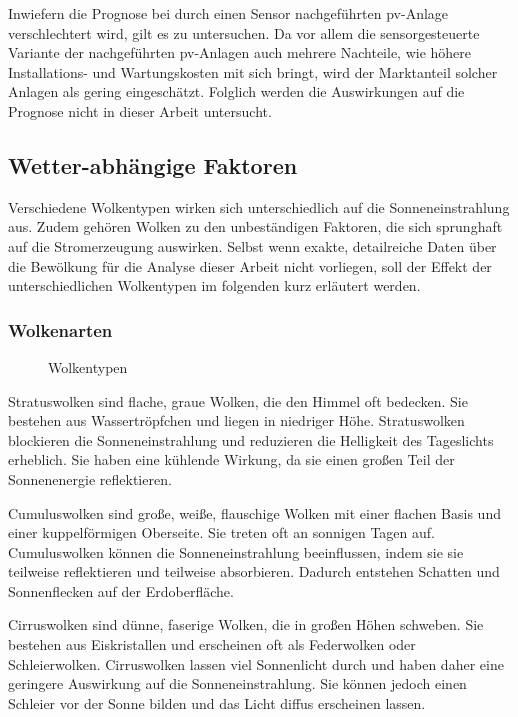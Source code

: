 \documentclass[12pt, a4paper]{article}
\begin{document}
Inwiefern die Prognose bei durch einen Sensor nachgeführten \ac{pv}-Anlage verschlechtert wird, gilt es zu untersuchen. Da vor allem die sensorgesteuerte Variante der nachgeführten \ac{pv}-Anlagen auch mehrere Nachteile, wie höhere Installations- und Wartungskosten mit sich bringt, wird der Marktanteil solcher Anlagen als gering eingeschätzt. Folglich werden die Auswirkungen auf die Prognose nicht in dieser Arbeit untersucht.

\subsection{Wetter-abhängige Faktoren}

Verschiedene Wolkentypen wirken sich unterschiedlich auf die Sonneneinstrahlung aus. Zudem gehören Wolken zu den unbeständigen Faktoren, die sich sprunghaft auf die Stromerzeugung auswirken. Selbst wenn exakte, detailreiche Daten über die Bewölkung für die Analyse dieser Arbeit nicht vorliegen, soll der Effekt der unterschiedlichen Wolkentypen im folgenden kurz erläutert werden.

\subsubsection{Wolkenarten}
\label{subsubsec:clouds}

\begin{figure}
\centering
\def\svgwidth{400pt}

\caption{Wolkentypen}
\label{wolkentypen}
\end{figure}


Stratuswolken sind flache, graue Wolken, die den Himmel oft bedecken. Sie bestehen aus Wassertröpfchen und liegen in niedriger Höhe. Stratuswolken blockieren die Sonneneinstrahlung und reduzieren die Helligkeit des Tageslichts erheblich. Sie haben eine kühlende Wirkung, da sie einen großen Teil der Sonnenenergie reflektieren.

Cumuluswolken sind große, weiße, flauschige Wolken mit einer flachen Basis und einer kuppelförmigen Oberseite. Sie treten oft an sonnigen Tagen auf. Cumuluswolken können die Sonneneinstrahlung beeinflussen, indem sie sie teilweise reflektieren und teilweise absorbieren. Dadurch entstehen Schatten und Sonnenflecken auf der Erdoberfläche.

Cirruswolken sind dünne, faserige Wolken, die in großen Höhen schweben. Sie bestehen aus Eiskristallen und erscheinen oft als Federwolken oder Schleierwolken. Cirruswolken lassen viel Sonnenlicht durch und haben daher eine geringere Auswirkung auf die Sonneneinstrahlung. Sie können jedoch einen Schleier vor der Sonne bilden und das Licht diffus erscheinen lassen.
\end{document}
